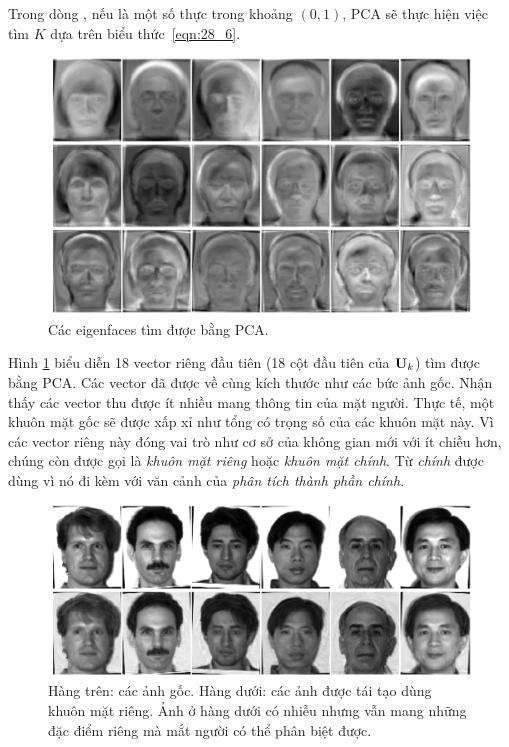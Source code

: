 Trong dòng , nếu
 là một số thực trong khoảng $(0, 1)$, PCA sẽ thực
hiện việc tìm $K$ dựa trên biểu thức~\eqref{eqn:28_6}.

\begin{figure}[t]
    \centering
    \includegraphics[width = \textwidth]{Chapters/07_DimemsionalityReduction/28_pca2/latex/yaleb_eig.pdf}
    \caption[]{Các eigenfaces tìm được bằng PCA.}
    \label{fig:28_2}
\end{figure}

Hình \ref{fig:28_2} biểu diễn 18 vector riêng đầu tiên (18 cột đầu tiên của
$\mathbf{U}_k$) tìm được bằng PCA. Các vector đã được  về cùng
kích thước như các bức ảnh gốc. Nhận thấy các
vector thu được ít nhiều mang thông tin của mặt người. Thực tế, một khuôn mặt
gốc sẽ được xấp xỉ như tổng có trọng số của các {khuôn mặt} này. Vì các
vector riêng này đóng vai trò như cơ sở của không gian mới với ít chiều hơn,
chúng còn được gọi là \textit{khuôn mặt riêng} hoặc \textit{khuôn mặt chính}. Từ \textit{chính} được dùng vì nó đi kèm với văn cảnh
của \textit{phân tích thành phần chính}.
\begin{figure}[t]
    \centering
    \includegraphics[width = \textwidth]{Chapters/07_DimemsionalityReduction/28_pca2/latex/yaleb_ori_res.pdf}
    \caption[]{Hàng trên: các ảnh gốc. Hàng dưới: các ảnh được tái tạo dùng khuôn mặt riêng. Ảnh ở hàng dưới có nhiễu nhưng vẫn mang những đặc điểm riêng mà mắt người có thể phân biệt được.}
    \label{fig:28_3}
\end{figure}

